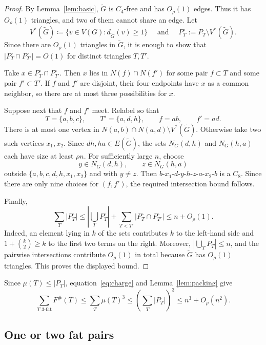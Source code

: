 \documentclass[11pt,letterpaper]{article}
\begin{document}
\begin{proof}
By Lemma~\ref{lem:basic}, \(\tilde{G}\) is \(C_4\)-free and has \(O_\rho(1)\) edges. Thus it has
\(O_\rho(1)\) triangles, and two of them cannot share an edge. Let 
\[
  V^*(\tilde{G})\coloneqq \{v\in V(G):d_{\tilde{G}}(v)\ge1\}\quad\text{ and }\quad P_T^\circ:=P_T\setminus V^*(\tilde{G}).
\]
Since there are \(O_\rho(1)\) triangles in \(\tilde{G}\), it is enough to show that
\(|P_T^\circ\cap P_{T'}^\circ|=O(1)\) for distinct triangles \(T,T'\).

Take \(x\in P_T^\circ\cap P_{T'}^\circ\). Then \(x\) lies in \(N(f)\cap N(f')\) for some pair
\(f\subset T\) and some pair \(f'\subset T'\). If \(f\) and \(f'\) are disjoint, their four endpoints
have \(x\) as a common neighbor, so there are at most three possibilities for \(x\).

Suppose next that \(f\) and \(f'\) meet. Relabel so that
\[
  T=\{a,b,c\},\qquad T'=\{a,d,h\},\qquad f=ab,\qquad f'=ad.
\]
There is at most one vertex in \(N(a,b)\cap N(a,d)\setminus V^*(\tilde{G})\). Otherwise take two such
vertices \(x_1,x_2\). Since \(dh,ha\in E(\tilde{G})\), the sets \(N_G(d,h)\) and \(N_G(h,a)\)
each have size at least \(\rho n\). For sufficiently large \(n\), choose
\[
  y\in N_G(d,h),\qquad z\in N_G(h,a)
\]
outside \(\{a,b,c,d,h,x_1,x_2\}\) and with \(y\ne z\).
Then $b$-$x_1$-$d$-$y$-$h$-$z$-$a$-$x_2$-$b$ is a \(C_8\). Since there are only nine choices for \((f,f')\), the required intersection bound follows.

Finally,
\[
  \sum_T|P_T^\circ|
  \le\left|\bigcup_TP_T^\circ\right|
     +\sum_{T<T'}|P_T^\circ\cap P_{T'}^\circ|
  \le n+O_\rho(1).
\]
Indeed, an element lying in \(k\) of the sets contributes \(k\) to the left-hand side and
\(1+\binom{k}{2}\ge k \) to the first two terms on the right. Moreover,
\(\left|\bigcup_TP_T^\circ\right|\le n\), and the pairwise intersections contribute \(O_\rho(1)\)
in total because \(\tilde{G}\) has \(O_\rho(1)\) triangles. This proves the displayed bound.
\end{proof}

Since \(\mu(T)\le|P_T|\), equation~\eqref{eq:charge} and Lemma~\ref{lem:packing} give
\begin{equation}\label{eq:fat-triangles}
  \sum_{T\text{ 3-fat}}F^{\#}(T)
  \le\sum_T\mu(T)^3
  \le\left(\sum_T|P_T|\right)^3
  \le n^3+O_\rho(n^2).
\end{equation}

\subsection{One or two fat pairs}
\end{document}
